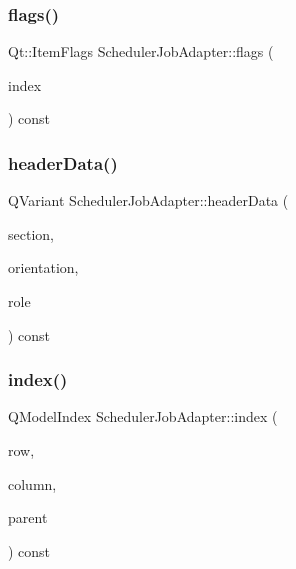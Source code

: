 \mbox{\label{class_scheduler_job_adapter_ac0b711328d73901be03ae9e381493c0c}} 
\subsubsection{\texorpdfstring{flags()}{flags()}}
{\footnotesize\ttfamily Qt\+::\+Item\+Flags Scheduler\+Job\+Adapter\+::flags (\begin{DoxyParamCaption}\item[{const Q\+Model\+Index \&}]{index }\end{DoxyParamCaption}) const\hspace{0.3cm}{\ttfamily [override]}}

\mbox{\label{class_scheduler_job_adapter_a75ab2de576527f254ee85b9b4e618e37}} 
\subsubsection{\texorpdfstring{headerData()}{headerData()}}
{\footnotesize\ttfamily Q\+Variant Scheduler\+Job\+Adapter\+::header\+Data (\begin{DoxyParamCaption}\item[{int}]{section,  }\item[{Qt\+::\+Orientation}]{orientation,  }\item[{int}]{role }\end{DoxyParamCaption}) const\hspace{0.3cm}{\ttfamily [override]}}

\mbox{\label{class_scheduler_job_adapter_a8f6d139992581af9639b7d0e6e418219}} 
\subsubsection{\texorpdfstring{index()}{index()}}
{\footnotesize\ttfamily Q\+Model\+Index Scheduler\+Job\+Adapter\+::index (\begin{DoxyParamCaption}\item[{int}]{row,  }\item[{int}]{column,  }\item[{const Q\+Model\+Index \&}]{parent }\end{DoxyParamCaption}) const\hspace{0.3cm}{\ttfamily [override]}}


